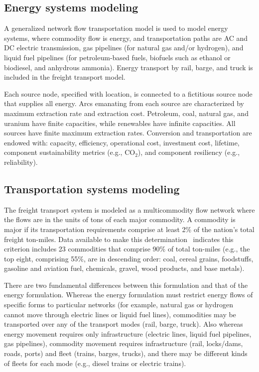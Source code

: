 \documentclass{article}
\begin{document}
\subsection{Energy systems modeling}
A generalized network flow transportation model \cite{quelhas1,quelhas2,gil_katrina} is used to model energy systems, where commodity flow is energy, and transportation paths are AC and DC electric transmission, gas pipelines (for natural gas and/or hydrogen), and liquid fuel pipelines (for petroleum-based fuels, biofuels such as ethanol or biodiesel, and anhydrous ammonia). Energy transport by rail, barge, and truck is included in the freight transport model.

Each source node, specified with location, is connected to a fictitious source node that supplies all energy. Arcs emanating from each source are characterized by maximum extraction rate and extraction cost. Petroleum, coal, natural gas, and uranium have finite capacities, while renewables have infinite capacities. All sources have finite maximum extraction rates. Conversion and transportation are endowed with: capacity, efficiency, operational cost, investment cost, lifetime, component sustainability metrics (e.g., CO$_2$), and component resiliency (e.g., reliability).

\subsection{Transportation systems modeling}
The freight transport system is modeled as a multicommodity flow network where the flows are in the units of tons of each major commodity. A commodity is major if its transportation requirements comprise at least 2\% of the nation's total freight ton-miles. Data available to make this determination~\cite{DOT_Forecasts} indicates this criterion includes 23 commodities that comprise 90\% of total ton-miles (e.g., the top eight, comprising 55\%, are in descending order: coal, cereal grains, foodstuffs, gasoline and aviation fuel, chemicals, gravel, wood products, and base metals).

There are two fundamental differences between this formulation and that of the energy formulation. Whereas the energy formulation must restrict energy flows of specific forms to particular networks (for example, natural gas or hydrogen cannot move through electric lines or liquid fuel lines), commodities may be transported over any of the transport modes (rail, barge, truck). Also whereas energy movement requires only infrastructure (electric lines, liquid fuel pipelines, gas pipelines), commodity movement requires infrastructure (rail, locks/dams, roads, ports) and fleet (trains, barges, trucks), and there may be different kinds of fleets for each mode (e.g., diesel trains or electric trains).
\end{document}
